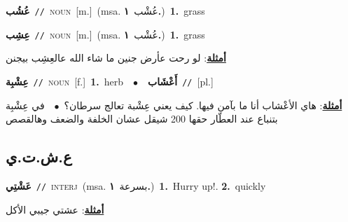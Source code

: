 \documentclass[10pt,a4paper,twoside]{article} %
\begin{document}
\begin{multicols}{2}
{\setlength\topsep{0pt}\textbf{\foreignlanguage{arabic}{عُشُب}}\ {\color{gray}\texttt{//}\color{black}}\ \textsc{noun}\ [m.]\ \color{gray}(msa. \foreignlanguage{arabic}{عُشْب}~\foreignlanguage{arabic}{\textbf{١.}})\color{black}\ \textbf{1.}~grass\ } \vspace{2mm}

{\setlength\topsep{0pt}\textbf{\foreignlanguage{arabic}{عِشِب}}\ {\color{gray}\texttt{//}\color{black}}\ \textsc{noun}\ [m.]\ \color{gray}(msa. \foreignlanguage{arabic}{عُشْب}~\foreignlanguage{arabic}{\textbf{١.}})\color{black}\ \textbf{1.}~grass\  \begin{flushright}\color{gray}\foreignlanguage{arabic}{\textbf{\underline{\foreignlanguage{arabic}{أمثلة}}}: لو رحت عأرض جنين ما شاء الله عالعِشِب بيجنن}\end{flushright}\color{black}} \vspace{2mm}

{\setlength\topsep{0pt}\textbf{\foreignlanguage{arabic}{عِشْبِة}}\ {\color{gray}\texttt{//}\color{black}}\ \textsc{noun}\ [f.]\ \textbf{1.}~herb\ \ $\bullet$\ \ \setlength\topsep{0pt}\textbf{\foreignlanguage{arabic}{أَعْشَاب}}\ {\color{gray}\texttt{//}\color{black}}\ [pl.]\  \begin{flushright}\color{gray}\foreignlanguage{arabic}{\textbf{\underline{\foreignlanguage{arabic}{أمثلة}}}: هاي الأعْشاب أنا ما بآمن فيها. كيف يعني عِشْبة تعالج سرطان؟\ $\bullet$\ \  في عِشْبِة بتنباع عند العطّار حقها 200 شيقل عشان الخلفة والضعف وهالقصص}\end{flushright}\color{black}} \vspace{2mm}

\vspace{-3mm}
\subsection*{\color{blue}\foreignlanguage{arabic}{ع.ش.ت.ي}\color{blue}{ (ntws)}} 

{\setlength\topsep{0pt}\textbf{\foreignlanguage{arabic}{عَشْتِي}}\ {\color{gray}\texttt{//}\color{black}}\ \textsc{interj}\ \color{gray}(msa. \foreignlanguage{arabic}{بسرعة}~\foreignlanguage{arabic}{\textbf{١.}})\color{black}\ \textbf{1.}~Hurry up!.  \textbf{2.}~quickly\  \begin{flushright}\color{gray}\foreignlanguage{arabic}{\textbf{\underline{\foreignlanguage{arabic}{أمثلة}}}: عشتي جيبي الأكل}\end{flushright}\color{black}} \vspace{2mm}


\end{multicols}
\end{document}
